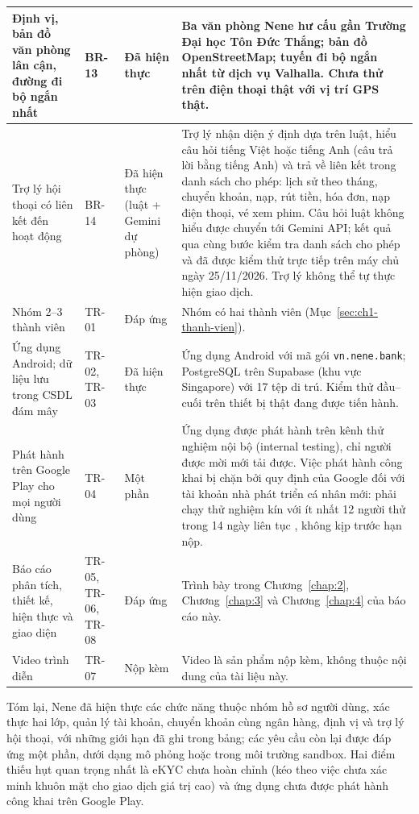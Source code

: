 \begin{longtable}{@{}p{3.3cm} p{1.5cm} p{2.4cm} p{7.0cm}@{}}
	\midrule
	Định vị, bản đồ văn phòng lân cận, đường đi bộ ngắn nhất & BR-13 & Đã hiện thực & Ba văn phòng Nene hư cấu gần Trường Đại học Tôn Đức Thắng; bản đồ OpenStreetMap; tuyến đi bộ ngắn nhất từ dịch vụ Valhalla. Chưa thử trên điện thoại thật với vị trí GPS thật. \\
	\midrule
	Trợ lý hội thoại có liên kết đến hoạt động & BR-14 & Đã hiện thực (luật + Gemini dự phòng) & Trợ lý nhận diện ý định dựa trên luật, hiểu câu hỏi tiếng Việt hoặc tiếng Anh (câu trả lời bằng tiếng Anh) và trả về liên kết trong danh sách cho phép: lịch sử theo tháng, chuyển khoản, nạp, rút tiền, hóa đơn, nạp điện thoại, vé xem phim. Câu hỏi luật không hiểu được chuyển tới Gemini API; kết quả qua cùng bước kiểm tra danh sách cho phép và đã được kiểm thử trực tiếp trên máy chủ ngày 25/11/2026. Trợ lý không thể tự thực hiện giao dịch. \\
	\midrule
	Nhóm 2--3 thành viên & TR-01 & Đáp ứng & Nhóm có hai thành viên (Mục~\ref{sec:ch1-thanh-vien}). \\
	\midrule
	Ứng dụng Android; dữ liệu lưu trong CSDL đám mây & TR-02, TR-03 & Đã hiện thực & Ứng dụng Android với mã gói \texttt{vn.\allowbreak{}nene.\allowbreak{}bank}; PostgreSQL trên Supabase (khu vực Singapore) với 17 tệp di trú. Kiểm thử đầu--cuối trên thiết bị thật đang được tiến hành. \\
	\midrule
	Phát hành trên Google Play cho mọi người dùng & TR-04 & Một phần & Ứng dụng được phát hành trên kênh thử nghiệm nội bộ (internal testing), chỉ người được mời mới tải được. Việc phát hành công khai bị chặn bởi quy định của Google đối với tài khoản nhà phát triển cá nhân mới: phải chạy thử nghiệm kín với ít nhất 12 người thử trong 14 ngày liên tục \parencite{ch5-play-testing}, không kịp trước hạn nộp. \\
	\midrule
	Báo cáo phân tích, thiết kế, hiện thực và giao diện & TR-05, TR-06, TR-08 & Đáp ứng & Trình bày trong Chương~\ref{chap:2}, Chương~\ref{chap:3} và Chương~\ref{chap:4} của báo cáo này. \\
	\midrule
	Video trình diễn & TR-07 & Nộp kèm & Video là sản phẩm nộp kèm, không thuộc nội dung của tài liệu này. \\
\end{longtable}
\endgroup

Tóm lại, Nene đã hiện thực các chức năng thuộc nhóm hồ sơ người dùng, xác thực hai lớp, quản lý tài khoản, chuyển khoản cùng ngân hàng, định vị và trợ lý hội thoại, với những giới hạn đã ghi trong bảng; các yêu cầu còn lại được đáp ứng một phần, dưới dạng mô phỏng hoặc trong môi trường sandbox. Hai điểm thiếu hụt quan trọng nhất là eKYC chưa hoàn chỉnh (kéo theo việc chưa xác minh khuôn mặt cho giao dịch giá trị cao) và ứng dụng chưa được phát hành công khai trên Google Play.

